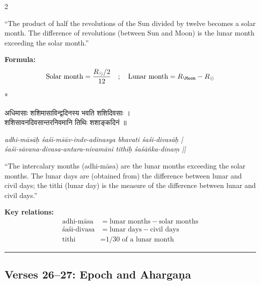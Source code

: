 \documentclass[11pt,a4paper]{article}
\newcommand{\dev}[1]{{\devanagarifont #1}}
\theoremstyle{definition}
\begin{document}
\begin{paracol}{2}
\begin{tcolorbox}[colback=transbg,colframe=vertrule!60,boxrule=0.5pt,arc=3pt,title={\small\bfseries Translation 23}]
``The product of half the revolutions of the Sun divided by twelve becomes a solar month. The difference of revolutions (between Sun and Moon) is the lunar month exceeding the solar month.''

\textbf{Formula:}
\[
\text{Solar month} = \frac{R_{\odot}/2}{12} \quad ; \quad \text{Lunar month} = R_{\Moon} - R_{\odot}
\]
\end{tcolorbox}

\switchcolumn[0]*\noindent
\begin{tcolorbox}[colback=sktbg,colframe=vertrule,boxrule=0.5pt,arc=3pt,title={\small\bfseries Verse 24}]
\dev{अधिमासाः शशिमासाविन्द्वदिनस्य भवति शशिदिवसाः ।\\
शशिसावनदिवसान्तरनिवमानि तिथिः शशाङ्कदिनं ॥}
\end{tcolorbox}

\switchcolumn\noindent
\begin{tcolorbox}[colback=transbg,colframe=vertrule!60,boxrule=0.5pt,arc=3pt,title={\small\bfseries Translation 24}]
\textit{adhi-m\=as\=a\d{h} \'{s}a\'{s}i-m\=s\=av-indv-adinasya bhavati \'{s}a\'{s}i-divas\=a\d{h} |\\
\'{s}a\'{s}i-s\=avana-divasa-antara-nivam\=ani tithi\d{h} \'{s}a\'{s}\=a\~nka-dina\d{m} ||}

``The intercalary months (adhi-m\=asa) are the lunar months exceeding the solar months. The lunar days are (obtained from) the difference between lunar and civil days; the tithi (lunar day) is the measure of the difference between lunar and civil days.''

\textbf{Key relations:}
\begin{align*}
\text{adhi-m\=asa} &= \text{lunar months} - \text{solar months} \\
\text{\'{s}a\'{s}i-divasa} &= \text{lunar days} - \text{civil days} \\
\text{tithi} &= \text{1/30 of a lunar month}
\end{align*}
\end{tcolorbox}

\end{paracol}

\vspace{0.5cm}
\noindent\rule{\textwidth}{0.6pt}
\vspace{0.5cm}

\subsection*{Verses 26--27: Epoch and Aharga\d{n}a}
\end{document}
